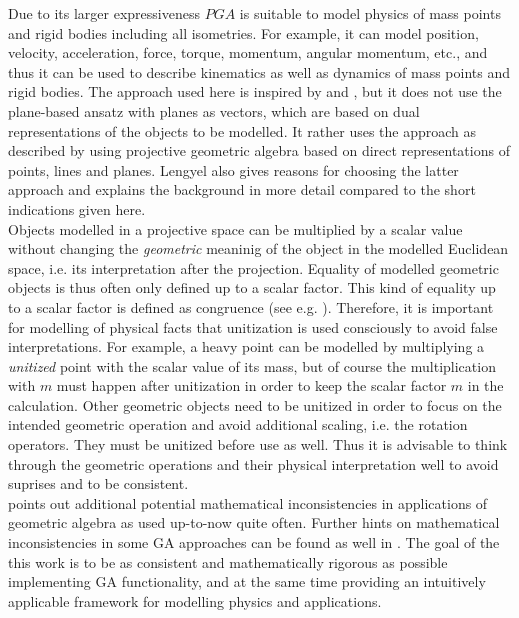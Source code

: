 Due to its larger expressiveness $PGA$ is suitable to model physics of mass points and
rigid bodies including all isometries. For example, it can model position, velocity,
acceleration, force, torque, momentum, angular momentum, etc., and thus it can be used to
describe kinematics as well as dynamics of mass points and rigid bodies. The approach used
here is inspired by \cite{Plane-based_PGA_Dorst-DeKennik:2022} and
\cite{Dynamics_in_PGA_plane-based_Dorst-DeKennik:2023}, but it does not use the
plane-based ansatz with planes as vectors, which are based on dual representations of the
objects to be modelled. It rather uses the approach as described by
\cite{Lengyel_pga-illuminated:2024} using projective geometric algebra based on direct
representations of points, lines and planes. Lengyel also gives reasons for choosing the
latter approach and explains the background in more detail compared to the short
indications given here. \\

Objects modelled in a projective space can be multiplied by a scalar value without
changing the \emph{geometric} meaninig of the object in the modelled Euclidean space, i.e.
its interpretation after the projection. Equality of modelled geometric objects is thus
often only defined up to a scalar factor. This kind of equality up to a scalar factor is
defined as congruence (see e.g. \cite{Browne_Grassmann-Algebra_Vol1:2012}). Therefore, it
is important for modelling of physical facts that unitization is used consciously to avoid
false interpretations. For example, a heavy point can be modelled by multiplying a
\emph{unitized} point with the scalar value of its mass, but of course the multiplication
with $m$ must happen after unitization in order to keep the scalar factor $m$ in the
calculation. Other geometric objects need to be unitized in order to focus on the intended
geometric operation and avoid additional scaling, i.e. the rotation operators. They must
be unitized before use as well. Thus it is advisable to think through the geometric
operations and their physical interpretation well to avoid suprises and to be consistent.
\\

\cite{Lengyel_poor-foundations_GA:2024} points out additional potential mathematical
inconsistencies in applications of geometric algebra as used up-to-now quite often.
Further hints on mathematical inconsistencies in some GA approaches can be found as well
in \cite{Kritchevsky_case_against_GA:2024}. The goal of the this work is to be as
consistent and mathematically rigorous as possible implementing GA functionality, and at
the same time providing an intuitively applicable framework for modelling physics and
applications. \\


